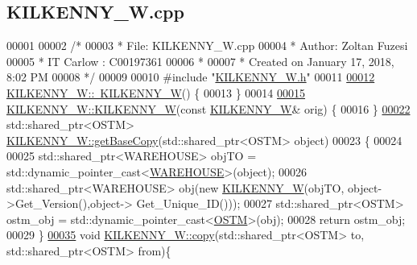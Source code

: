\hypertarget{_k_i_l_k_e_n_n_y___w_8cpp_source}{}\subsection{K\+I\+L\+K\+E\+N\+N\+Y\+\_\+\+W.\+cpp}

\begin{DoxyCode}
00001 
00002 \textcolor{comment}{/* }
00003 \textcolor{comment}{ * File:   KILKENNY\_W.cpp}
00004 \textcolor{comment}{ * Author: Zoltan Fuzesi}
00005 \textcolor{comment}{ * IT Carlow : C00197361}
00006 \textcolor{comment}{ *}
00007 \textcolor{comment}{ * Created on January 17, 2018, 8:02 PM}
00008 \textcolor{comment}{ */}
00009 
00010 \textcolor{preprocessor}{#include "\hyperlink{_k_i_l_k_e_n_n_y___w_8h}{KILKENNY\_W.h}"}
00011 
\hypertarget{_k_i_l_k_e_n_n_y___w_8cpp_source.tex_l00012}{}\hyperlink{class_k_i_l_k_e_n_n_y___w_a5b3f84f505c05449d9a7235f25ff3694_a5b3f84f505c05449d9a7235f25ff3694}{00012} \hyperlink{class_k_i_l_k_e_n_n_y___w_a5b3f84f505c05449d9a7235f25ff3694_a5b3f84f505c05449d9a7235f25ff3694}{KILKENNY\_W::~KILKENNY\_W}() \{
00013 \}
00014 
\hypertarget{_k_i_l_k_e_n_n_y___w_8cpp_source.tex_l00015}{}\hyperlink{class_k_i_l_k_e_n_n_y___w_a370a1fb0d26d2b80da6e1101921d1564_a370a1fb0d26d2b80da6e1101921d1564}{00015} \hyperlink{class_k_i_l_k_e_n_n_y___w_aee4c4b30bc934ff827f0851077b7fbab_aee4c4b30bc934ff827f0851077b7fbab}{KILKENNY\_W::KILKENNY\_W}(\textcolor{keyword}{const} \hyperlink{class_k_i_l_k_e_n_n_y___w}{KILKENNY\_W}& orig) \{
00016 \}
\hypertarget{_k_i_l_k_e_n_n_y___w_8cpp_source.tex_l00022}{}\hyperlink{class_k_i_l_k_e_n_n_y___w_ad8c5f7f6ac7689fa9acd6cafb0cb69a4_ad8c5f7f6ac7689fa9acd6cafb0cb69a4}{00022} std::shared\_ptr<OSTM> \hyperlink{class_k_i_l_k_e_n_n_y___w_ad8c5f7f6ac7689fa9acd6cafb0cb69a4_ad8c5f7f6ac7689fa9acd6cafb0cb69a4}{KILKENNY\_W::getBaseCopy}(std::shared\_ptr<OSTM> \textcolor{keywordtype}{object})
00023 \{
00024 
00025     std::shared\_ptr<WAREHOUSE> objTO = std::dynamic\_pointer\_cast<\hyperlink{class_w_a_r_e_h_o_u_s_e}{WAREHOUSE}>(object);
00026     std::shared\_ptr<WAREHOUSE> obj(\textcolor{keyword}{new} \hyperlink{class_k_i_l_k_e_n_n_y___w_aee4c4b30bc934ff827f0851077b7fbab_aee4c4b30bc934ff827f0851077b7fbab}{KILKENNY\_W}(objTO, object->Get\_Version(),\textcolor{keywordtype}{object}->
      Get\_Unique\_ID()));
00027     std::shared\_ptr<OSTM> ostm\_obj = std::dynamic\_pointer\_cast<\hyperlink{class_o_s_t_m}{OSTM}>(obj);
00028     \textcolor{keywordflow}{return} ostm\_obj;
00029 \}
\hypertarget{_k_i_l_k_e_n_n_y___w_8cpp_source.tex_l00035}{}\hyperlink{class_k_i_l_k_e_n_n_y___w_a36a02e862f3563fbab3c94dfec4a0934_a36a02e862f3563fbab3c94dfec4a0934}{00035} \textcolor{keywordtype}{void} \hyperlink{class_k_i_l_k_e_n_n_y___w_a36a02e862f3563fbab3c94dfec4a0934_a36a02e862f3563fbab3c94dfec4a0934}{KILKENNY\_W::copy}(std::shared\_ptr<OSTM> to, std::shared\_ptr<OSTM> from)\{

\end{DoxyCode}
